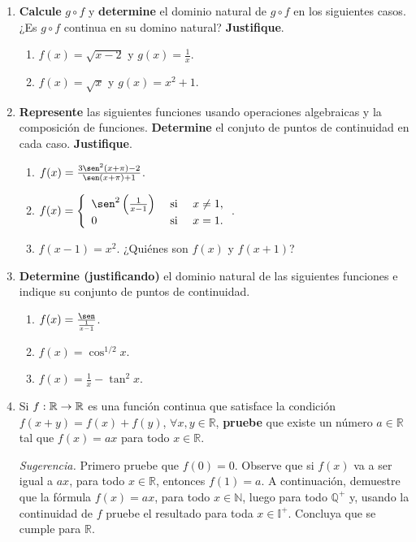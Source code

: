 \documentclass[12pt]{article}
\begin{document}
\begin{enumerate}
    \item \textbf{Calcule} $g\circ f$ y \textbf{determine} el dominio natural de $g\circ f$ en los siguientes casos. ¿Es $g\circ f$ continua en su domino natural? \textbf{Justifique}.
    \begin{enumerate}
        \item $f(x)=\sqrt{x-2}$ y $g(x)=\frac{1}{x}$.
        \item $f(x)=\sqrt{x}$ y $g(x)=x^2+1$.
    \end{enumerate}

    \item \textbf{Represente} las siguientes funciones usando operaciones algebraicas y la composición de funciones. \textbf{Determine} el conjuto de puntos de continuidad en cada caso. \textbf{Justifique}.
    \begin{enumerate}
        \item $f(x)=\frac{3\sen^2(x+\pi)-2}{\sen(x+\pi)+1}$.
        \item $f(x)=\left\{
            \begin{array}{lcr}
                \sen^2\left(\frac{1}{x-1} \right) & \textup{ si } & x\neq 1,\\
                0 & \textup{ si } & x = 1.\\
            \end{array}
        \right.$.
        \item $f(x-1)=x^2$. ¿Quiénes son $f(x)$ y $f(x+1)$?
    \end{enumerate}
    
    \item  \textbf{Determine (justificando)} el dominio natural de las siguientes funciones e indique su conjunto de puntos de continuidad.
    \begin{enumerate}
        \item $f(x)=\frac{\sen}{\frac{1}{x-1}}$.
        \item $f(x)=\cos^{1/2}x$.
        \item $f(x)=\frac{1}{x}-\tan^2x$.
    \end{enumerate}

    \item Si $f:\mathbb{R}\rightarrow\mathbb{R}$ es una función continua que satisface la condición $f(x+y)=f(x)+f(y)$, $\forall x,y\in\mathbb{R}$, \textbf{pruebe} que existe un número $a\in\mathbb{R}$ tal que $f(x)=ax$ para todo $x\in\mathbb{R}$.

    \textit{Sugerencia.} Primero pruebe que $f(0)=0$. Observe que si $f(x)$ va a ser igual a $ax$, para todo $x\in\mathbb{R}$, entonces $f(1)=a$. A continuación, demuestre que la fórmula $f(x)=ax$, para todo $x\in\mathbb{N}$, luego para todo $\mathbb{Q}^+$ y, usando la continuidad de $f$ pruebe el resultado para toda $x\in\mathbb{I}^+$. Concluya que se cumple para $\mathbb{R}$.


\end{enumerate}
\end{document}

